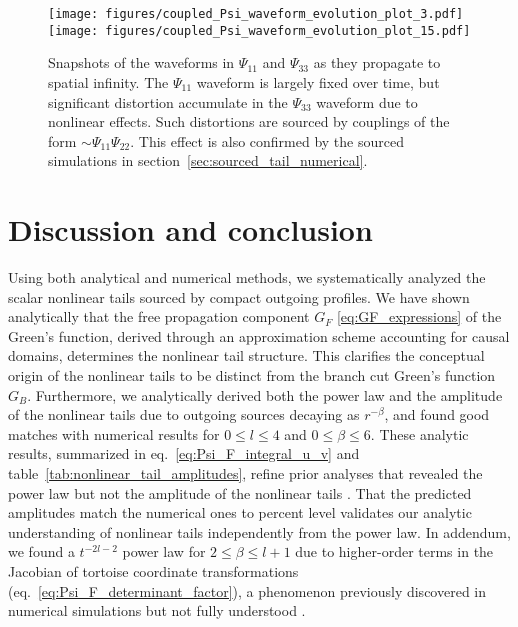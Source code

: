 \documentclass[reprint,aps,physrev,superscriptaddress,10pt,notitlepage,prd,nofootinbib,onecolumn]{revtex4-2}
\newcommand{\tref}[1]{table~\ref{#1}}
\newcommand{\sref}[1]{section~\ref{#1}}
\begin{document}
\begin{figure}[t]
  \centering
  \texttt{[image: figures/coupled\_Psi\_waveform\_evolution\_plot\_3.pdf]}
  \texttt{[image: figures/coupled\_Psi\_waveform\_evolution\_plot\_15.pdf]}
  \caption{Snapshots of the waveforms in $\Psi_{11}$ and $\Psi_{33}$ as they propagate to spatial infinity.
    The $\Psi_{11}$ waveform is largely fixed over time, but significant distortion accumulate in the $\Psi_{33}$ waveform due to nonlinear effects.
    Such distortions are sourced by couplings of the form $\sim \Psi_{11} \Psi_{22}$.
    This effect is also confirmed by the sourced simulations in \sref{sec:sourced_tail_numerical}.
  }
  \label{fig:coupled_Psi_waveform_evolution_plot}
\end{figure}


\section{Discussion and conclusion}
\label{sec:conclusion}


Using both analytical and numerical methods, we systematically analyzed the scalar nonlinear tails sourced by compact outgoing profiles.
We have shown analytically that the free propagation component \( G_F \) \eqref{eq:GF_expressions} of the Green's function, derived through an approximation scheme accounting for causal domains, determines the nonlinear tail structure.
This clarifies the conceptual origin of the nonlinear tails to be distinct from the branch cut Green's function $G_B$.
Furthermore, we analytically derived both the power law and the amplitude of the nonlinear tails due to outgoing sources decaying as $r^{-\beta}$, and found good matches with numerical results for $0 \leq l \leq 4$ and $0 \leq \beta \leq 6$.
These analytic results, summarized in eq.~\eqref{eq:Psi_F_integral_u_v} and \tref{tab:nonlinear_tail_amplitudes}, refine prior analyses that revealed the power law but not the amplitude of the nonlinear tails \cite{Cardoso:2024jme}.
That the predicted amplitudes match the numerical ones to percent level validates our analytic understanding of nonlinear tails independently from the power law.
In addendum, we found a $t^{-2l-2}$ power law for $2 \leq \beta \leq l+1$ due to higher-order terms in the Jacobian of tortoise coordinate transformations (eq.~\eqref{eq:Psi_F_determinant_factor}), a phenomenon previously discovered in numerical simulations but not fully understood \cite{Cardoso:2024jme}.
\end{document}
